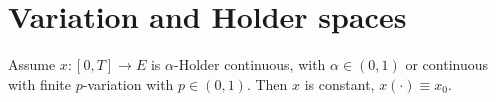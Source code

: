 \section{Variation and Holder spaces}

\begin{prop}
    Assume $x: [0,T] \rightarrow E$ is $\alpha$-Holder continuous, with $\alpha \in (0,1)$ or continuous with finite $p$-variation with $p \in (0, 1).$
    Then $x$ is constant, $x(\cdot) \equiv x_0.$
\end{prop}